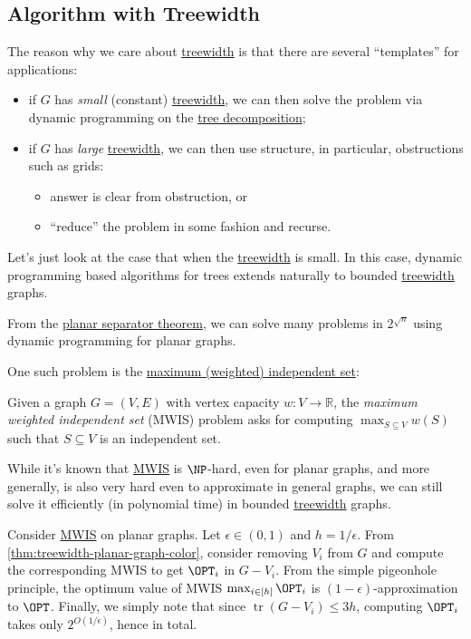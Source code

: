 \subsection{Algorithm with Treewidth}
The reason why we care about \hyperref[def:treewidth]{treewidth} is that there are several ``templates'' for applications:
\begin{itemize}
	\item if \(G\) has \emph{small} (constant) \hyperref[def:treewidth]{treewidth}, we can then solve the problem via dynamic programming on the \hyperref[def:tree-decomposition]{tree decomposition};
	\item if \(G\) has \emph{large} \hyperref[def:treewidth]{treewidth}, we can then use structure, in particular, obstructions such as grids:
	      \begin{itemize}
		      \item answer is clear from obstruction, or
		      \item ``reduce'' the problem in some fashion and recurse.
	      \end{itemize}
\end{itemize}

Let's just look at the case that when the \hyperref[def:treewidth]{treewidth} is small. In this case, dynamic programming based algorithms for trees extends naturally to bounded \hyperref[def:treewidth]{treewidth} graphs.

\begin{eg}
	From the \hyperref[eg:planar-separator-theorem]{planar separator theorem}, we can solve many problems in \(2^{\sqrt{n} }\) using dynamic programming for planar graphs.
\end{eg}

One such problem is the \hyperref[prb:MWIS]{maximum (weighted) independent set}:

\begin{problem}\label{prb:MWIS}
Given a graph \(G = (V, E)\) with vertex capacity \(w \colon V \to \mathbb{R} \), the \emph{maximum weighted independent set} (MWIS) problem asks for computing \(\max _{S \subseteq V} w(S)\) such that \(S \subseteq V\) is an independent set.
\end{problem}

While it's known that \hyperref[prb:MWIS]{MWIS} is \(\NP\)-hard, even for planar graphs, and more generally, is also very hard even to approximate in general graphs, we can still solve it efficiently (in polynomial time) in bounded \hyperref[def:treewidth]{treewidth} graphs.

\begin{eg}
	Consider \hyperref[prb:MWIS]{MWIS} on planar graphs. Let \(\epsilon \in (0, 1)\) and \(h = 1 / \epsilon \). From \autoref{thm:treewidth-planar-graph-color}, consider removing \(V_i\) from \(G\) and compute the corresponding MWIS to get \(\OPT_i\) in \(G - V_i\). From the simple pigeonhole principle, the optimum value of MWIS \(\max _{i\in [h]} \OPT_i\) is \((1-\epsilon)\)-approximation to \(\OPT\). Finally, we simply note that since \(\operatorname{tr}(G-V_i) \leq 3h\), computing \(\OPT_i\) takes only \(2^{O(1 / \epsilon )}\), hence in total.
\end{eg}